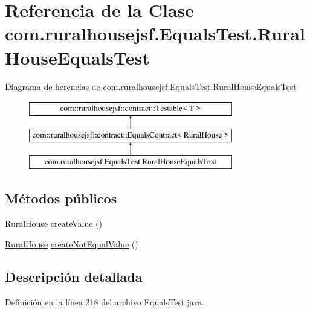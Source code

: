 \hypertarget{classcom_1_1ruralhousejsf_1_1_equals_test_1_1_rural_house_equals_test}{}\section{Referencia de la Clase com.\+ruralhousejsf.\+Equals\+Test.\+Rural\+House\+Equals\+Test}
\label{classcom_1_1ruralhousejsf_1_1_equals_test_1_1_rural_house_equals_test}
Diagrama de herencias de com.\+ruralhousejsf.\+Equals\+Test.\+Rural\+House\+Equals\+Test\begin{figure}[H]
\begin{center}
\leavevmode
\includegraphics[height=3.000000cm]{d7/def/classcom_1_1ruralhousejsf_1_1_equals_test_1_1_rural_house_equals_test}
\end{center}
\end{figure}
\subsection*{Métodos públicos}
\begin{DoxyCompactItemize}
\item 
\mbox{\hyperlink{classcom_1_1ruralhousejsf_1_1domain_1_1_rural_house}{Rural\+House}} \mbox{\hyperlink{classcom_1_1ruralhousejsf_1_1_equals_test_1_1_rural_house_equals_test_abcab55b3e63c8d5511f04e395ff0f111}{create\+Value}} ()
\item 
\mbox{\hyperlink{classcom_1_1ruralhousejsf_1_1domain_1_1_rural_house}{Rural\+House}} \mbox{\hyperlink{classcom_1_1ruralhousejsf_1_1_equals_test_1_1_rural_house_equals_test_a4021dc1a2dacaed55fa5bacec7ca6165}{create\+Not\+Equal\+Value}} ()
\end{DoxyCompactItemize}


\subsection{Descripción detallada}


Definición en la línea 218 del archivo Equals\+Test.\+java.



